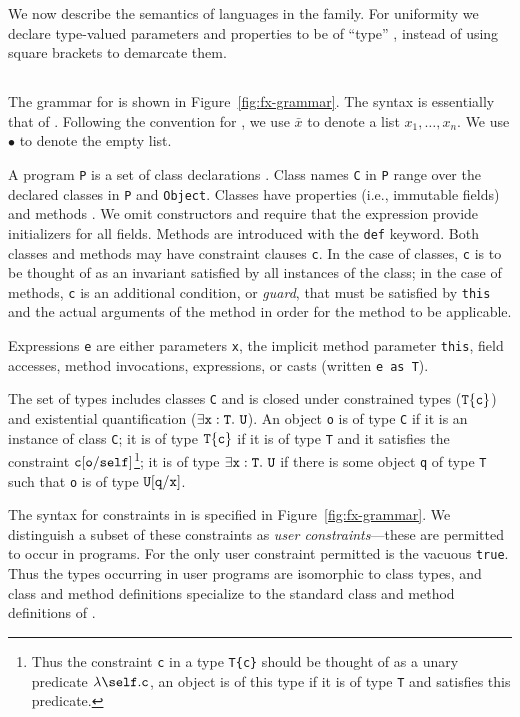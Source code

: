 \newcommand{\constraint}{{\tt constraint}}

We now describe the semantics of languages in the \FX{} family.
For uniformity we declare type-valued parameters and properties
to be of ``type'' \type, instead of using square brackets to demarcate
them.


\subsection{\FXZ}

The grammar for \FXZ{} is shown in Figure~\ref{fig:fx-grammar}.
The syntax is essentially that of \FJ{}.
Following the convention for \FJ{}, we use $\bar{x}$ to denote a
list $x_1, \dots, x_n$.  We use $\bullet$ to denote the empty
list.

A program {\tt P} is a set of class declarations .
Class names {\tt C} in {\tt P} range over the declared classes in {\tt P} 
and {\tt Object}.
Classes have
properties (i.e., immutable fields)  and methods .  We omit constructors
and require that the \new{} expression provide initializers
for all fields. 
Methods are introduced with the {\tt def} keyword.
Both classes and methods may have constraint clauses
{\tt c}.  In the case of classes, {\tt c} is to be thought of as an
invariant satisfied by all instances of the class; in the case of
methods, {\tt c} is an additional condition, or {\em guard},
that must be satisfied by
{\tt this} and the actual arguments of the method in order for the method to
be applicable. 

Expressions {\tt e} are either parameters {\tt x}, the implicit
method parameter {\tt this}, field accesses, method invocations, \new{}
expressions, or casts (written {\tt e as T}).

The set of types includes classes {\tt C} and is closed under
constrained types ($\tt T\{c\}$) and existential
quantification ($\exists \tt x:T.~U$).
An object {\tt o} is of type {\tt C} if it is an instance of class {\tt C}; it is of type $\tt
T\{c\}$ if it is of type {\tt T} and it satisfies the constraint $\tt
c[o/self]$\footnote{Thus the constraint {\tt c} in a type {\tt T\{c\}}
should be thought of as a unary predicate $\lambda\self.{\tt c}$, an
object is of this type if it is of type {\tt T} and satisfies this
predicate.}; it is of type $\exists \tt x:T.~U$
if there is some object {\tt q}
of type {\tt T} such that {\tt o} is of type
$\tt U[q/x]$.

The syntax for constraints in \FXZ{} is specified in
Figure~\ref{fig:fx-grammar}. We distinguish a subset of these constraints as
{\em user constraints}---these are permitted to occur in
programs. For \FXZ{} the only user constraint permitted is the vacuous
{\tt true}. Thus the types occurring in user programs are isomorphic
to class types, and class and method definitions specialize to the
standard class and method definitions of \FJ{}. 

